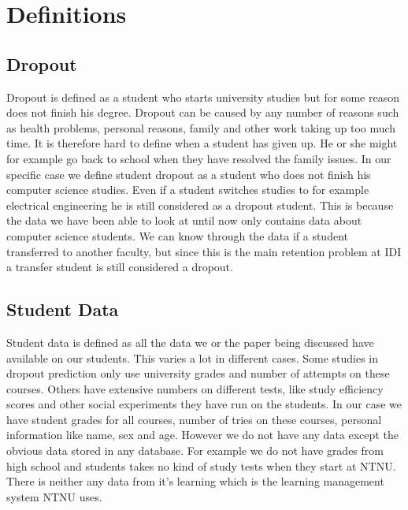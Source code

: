 \section{Definitions}
\subsection{Dropout}
Dropout is defined as a student who starts university studies but for some reason does not finish his degree. 
Dropout can be caused by any number of reasons such as health problems, personal reasons, family and other work taking up too much time.
It is therefore hard to define when a student has given up. 
He or she might for example go back to school when they have resolved the family issues.
In our specific case we define student dropout as a student who does not finish his computer science studies.
Even if a student switches studies to for example electrical engineering he is still considered as a dropout student.
This is because the data we have been able to look at until now only contains data about computer science students.
We can know through the data if a student transferred to another faculty, but since this is the main retention problem at IDI a transfer student is still considered a dropout.

\subsection{Student Data}
Student data is defined as all the data we or the paper being discussed have available on our students.
This varies a lot in different cases.
Some studies in dropout prediction only use university grades and number of attempts on these courses.
Others have extensive numbers on different tests,
like study efficiency scores and other social experiments they have run on the students. 
In our case we have student grades for all courses,
number of tries on these courses,
personal information like name, sex and age.
However we do not have any data except the obvious data stored in any database.
For example we do not have grades from high school and students takes no kind of study tests when they start at NTNU.
There is neither any data from it's learning which is the learning management system NTNU uses. 

